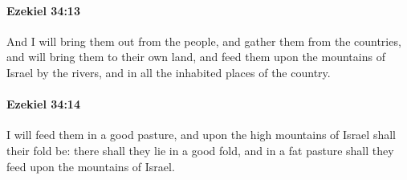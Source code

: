 		\paragraph{Ezekiel 34:13} %
			\label{EZEKIEL-34-13}

			And I will bring them out from the people, and gather them from the countries, and will bring them to their own land, and feed them upon the mountains of Israel by the rivers, and in all the inhabited places of the country.


		\paragraph{Ezekiel 34:14} %
			\label{EZEKIEL-34-14}

			I will feed them in a good pasture, and upon the high mountains of Israel shall their fold be: there shall they lie in a good fold, and in a fat pasture shall they feed upon the mountains of Israel.

